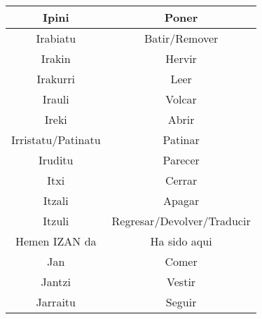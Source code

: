 \documentclass[11pt, a4paper]{article}
\begin{document}
\begin{table}[h]
\begin{tabular}{cc}
		                         Ipini                           &                             Poner                              \\ \hline
		                        Irabiatu                         &                         Batir/Remover                          \\ \hline
		                         Irakin                          &                             Hervir                             \\ \hline
		                        Irakurri                         &                              Leer                              \\ \hline
		                         Irauli                          &                             Volcar                             \\ \hline
		                         Ireki                           &                             Abrir                              \\ \hline
		                   Irristatu/Patinatu                    &                            Patinar                             \\ \hline
		                        Iruditu                          &                            Parecer                             \\ \hline
		                          Itxi                           &                             Cerrar                             \\ \hline
		                         Itzali                          &                             Apagar                             \\ \hline
		                         Itzuli                          &                   Regresar/Devolver/Traducir                   \\ \hline
		                     Hemen IZAN da                       &                          Ha sido aqui                          \\ \hline
		                          Jan                            &                             Comer                              \\ \hline
		                         Jantzi                          &                             Vestir                             \\ \hline
		                        Jarraitu                         &                             Seguir                             \\ \hline

\end{tabular}
\end{table}
\end{document}
